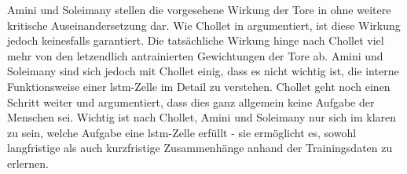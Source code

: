 Amini und Soleimany stellen die vorgesehene Wirkung der Tore in \cite{6S191RNN} ohne weitere kritische Auseinandersetzung dar.
Wie Chollet in \cite[S. 263]{DeepLearningPythonKeras} argumentiert, ist diese Wirkung jedoch keinesfalls garantiert.
Die tatsächliche Wirkung hinge nach Chollet viel mehr von den letzendlich antrainierten Gewichtungen der Tore ab.
Amini und Soleimany sind sich jedoch mit Chollet einig, dass es nicht wichtig ist, die interne Funktionsweise einer \acrshort{lstm}-Zelle im Detail zu verstehen.
Chollet geht noch einen Schritt weiter und argumentiert, dass dies ganz allgemein keine Aufgabe der Menschen sei.
Wichtig ist nach Chollet, Amini und Soleimany nur sich im klaren zu sein, welche Aufgabe eine \acrshort{lstm}-Zelle erfüllt - sie ermöglicht es, sowohl langfristige als auch kurzfristige Zusammenhänge anhand der Trainingsdaten zu erlernen.


